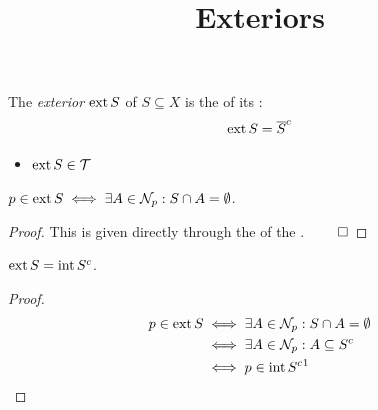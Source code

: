 \documentclass{atomic}
\title{Exteriors}
\begin{document}
    \pagestyle{plain}  \noindent
    The \textit{exterior} $\operatorname{ext} {S}$ of $S \subseteq X$ is the  of its :
    $$\operatorname{ext} S = \overline{S}^c$$

    \begin{itemize}
        \item $\operatorname{ext} S \in \mathcal{T}$
    \end{itemize}

    \begin{characterisation*} \label{characterisation}
        $p \in \operatorname{ext} S \iff \exists A \in \mathcal{N}_p : S \cap A = \emptyset$\footnotemark.
    \end{characterisation*}
    \begin{proof}
        This is given directly through the  of the . $\qed$
    \end{proof}

    \begin{theorem} \label{complement}
        $\operatorname{ext} S = \operatorname{int} S^c$.
    \end{theorem}
    \begin{proof}
        \phantom{}\vspace{-2em}
        \begin{align*}
            p \in \ext S &\iff \exists A \in \mathcal{N}_p : S \cap A = \emptyset \\
            &\iff \exists A \in \mathcal{N}_p : A \subseteq S^c \\
            &\iff p \in \inte S^c\text{\footnotemark}
        \end{align*}
    \end{proof}

\end{document}
